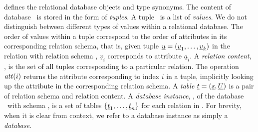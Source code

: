 

 defines the relational database objects and type synonyms.
The content of database \pDB\ is stored in the form of \emph{tuples}. A tuple
\pTuple\ is a list of \emph{values}. We do not distinguish between
different types of values within a relational database.
%
The order of values within a tuple correspond to the order of attributes in its corresponding
relation schema, that is, given tuple $\pTuple = \paran {\vi {\underline v} k}$
in the relation with relation schema \vRel {},
$\underline{v}_i$ corresponds to attribute $\underline{a}_i$.
%
A \emph{relation content}, \pRelCont, is the set of all tuples  corresponding to a particular relation.
%
The operation $\getAtt {i}$ returns the attribute corresponding to index $i$ in
a tuple, implicitly looking up the attribute in the corresponding relation
schema.
%
A \emph{table} \ensuremath{\pTab = \left(\pRelSch, \pRelCont\right)} is a pair
of relation schema and relation content.
%
A \emph{database instance}, \pInst, of the database \pDB\ with schema \pSch, is
a set of tables $\setDef {\pTab_1, \ldots, \pTab_n}$ for each relation in
\pSch.
For brevity, when it is clear from context, we refer to a database instance as
simply a \emph{database}.




